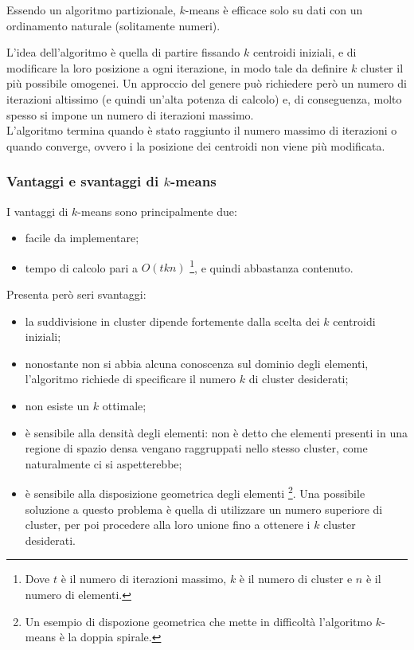 Essendo un algoritmo partizionale, $k$-means è efficace solo su dati con un ordinamento naturale (solitamente numeri).

L'idea dell'algoritmo è quella di partire fissando $k$ centroidi iniziali, e di modificare la loro posizione a ogni iterazione, in modo tale da definire $k$ cluster il più possibile omogenei.
Un approccio del genere può richiedere però un numero di iterazioni altissimo (e quindi un'alta potenza di calcolo) e, di conseguenza, molto spesso si impone un numero di iterazioni massimo.\\
L'algoritmo termina quando è stato raggiunto il numero massimo di iterazioni o quando converge, ovvero i la posizione dei centroidi non viene più modificata.

\subsubsection{Vantaggi e svantaggi di $k$-means}
I vantaggi di $k$-means sono principalmente due:
\begin{itemize}
    \item facile da implementare;
    \item tempo di calcolo pari a $O(tkn)$ \footnote{Dove $t$ è il numero di iterazioni massimo, $k$ è il numero di cluster e $n$ è il numero di elementi.}, e quindi abbastanza contenuto. 
\end{itemize}
Presenta però seri svantaggi:
\begin{itemize}
    \item la suddivisione in cluster dipende fortemente dalla scelta dei $k$ centroidi iniziali;
    \item nonostante non si abbia alcuna conoscenza sul dominio degli elementi, l'algoritmo richiede di specificare il numero $k$ di cluster desiderati;
    \item non esiste un $k$ ottimale;
    \item è sensibile alla densità degli elementi: non è detto che elementi presenti in una regione di spazio densa vengano raggruppati nello stesso cluster, come naturalmente ci si aspetterebbe;
    \item è sensibile alla disposizione geometrica degli elementi \footnote{Un esempio di dispozione geometrica che mette in difficoltà l'algoritmo $k$-means è la doppia spirale.}. Una possibile soluzione a questo problema è quella di utilizzare un numero superiore di cluster, per poi procedere alla loro unione fino a ottenere i $k$ cluster desiderati.
\end{itemize}


